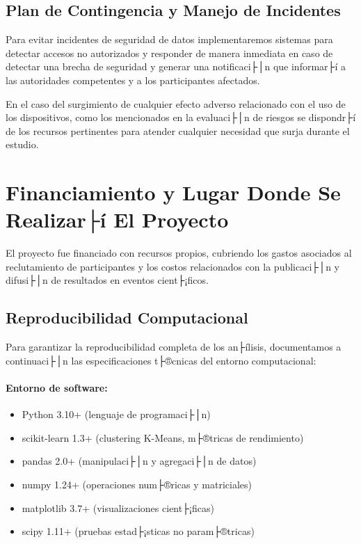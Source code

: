 \subsection{Plan de Contingencia y Manejo de Incidentes}
\label{subsec:plan_contingencia}

Para evitar incidentes de seguridad de datos implementaremos sistemas para detectar accesos no autorizados y responder de manera inmediata en caso de detectar una brecha de seguridad y generar una notificaci├│n que informar├í a las autoridades competentes y a los participantes afectados.

En el caso del surgimiento de cualquier efecto adverso relacionado con el uso de los dispositivos, como los mencionados en la evaluaci├│n de riesgos se dispondr├í de los recursos pertinentes para atender cualquier necesidad que surja durante el estudio.

\section{Financiamiento y Lugar Donde Se Realizar├í El Proyecto}
\label{sec:financiamiento_lugar}

El proyecto fue financiado con recursos propios, cubriendo los gastos asociados al reclutamiento de participantes y los costos relacionados con la publicaci├│n y difusi├│n de resultados en eventos cient├¡ficos.

\subsection{Reproducibilidad Computacional}
\label{subsec:reproducibilidad_computacional}

Para garantizar la reproducibilidad completa de los an├ílisis, documentamos a continuaci├│n las especificaciones t├®cnicas del entorno computacional:

\paragraph{Entorno de software:}
\begin{itemize}
    \item Python 3.10+ (lenguaje de programaci├│n)
    \item scikit-learn 1.3+ (clustering K-Means, m├®tricas de rendimiento)
    \item pandas 2.0+ (manipulaci├│n y agregaci├│n de datos)
    \item numpy 1.24+ (operaciones num├®ricas y matriciales)
    \item matplotlib 3.7+ (visualizaciones cient├¡ficas)
    \item scipy 1.11+ (pruebas estad├¡sticas no param├®tricas)
\end{itemize}

